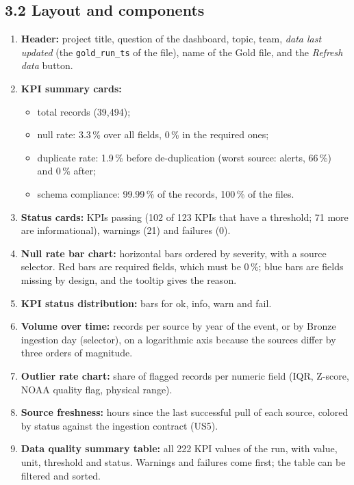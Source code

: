 \documentclass[stu, 12pt, letterpaper, donotrepeattitle, floatsintext, natbib]{apa7}
\begin{document}
\subsection{3.2 Layout and components}
\begin{enumerate}
    \item \textbf{Header:} project title, question of the dashboard, topic, team, \emph{data last updated} (the \texttt{gold\_run\_ts} of the file), name of the Gold file, and the \emph{Refresh data} button.
    \item \textbf{KPI summary cards:}
    \begin{itemize}
        \item total records (39,494);
        \item null rate: 3.3\,\% over all fields, 0\,\% in the required ones;
        \item duplicate rate: 1.9\,\% before de-duplication (worst source: alerts, 66\,\%) and 0\,\% after;
        \item schema compliance: 99.99\,\% of the records, 100\,\% of the files.
    \end{itemize}
    \item \textbf{Status cards:} KPIs passing (102 of 123 KPIs that have a threshold; 71 more are informational), warnings (21) and failures (0).
    \item \textbf{Null rate bar chart:} horizontal bars ordered by severity, with a source selector. Red bars are required fields, which must be 0\,\%; blue bars are fields missing by design, and the tooltip gives the reason.
    \item \textbf{KPI status distribution:} bars for ok, info, warn and fail.
    \item \textbf{Volume over time:} records per source by year of the event, or by Bronze ingestion day (selector), on a logarithmic axis because the sources differ by three orders of magnitude.
    \item \textbf{Outlier rate chart:} share of flagged records per numeric field (IQR, Z-score, NOAA quality flag, physical range).
    \item \textbf{Source freshness:} hours since the last successful pull of each source, colored by status against the ingestion contract (US5).
    \item \textbf{Data quality summary table:} all 222 KPI values of the run, with value, unit, threshold and status. Warnings and failures come first; the table can be filtered and sorted.
\end{enumerate}
\end{document}
